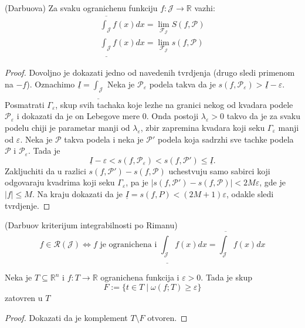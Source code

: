\documentclass[a4paper,12pt]{article}
\newcommand{\f}{\mathscr{F}}
\newcommand{\RR}{\mathbb{R}}
\newcommand{\eps}{\varepsilon}
\newcommand{\psj}{\subseteq}
\begin{document}
\begin{tma}(Darbuova)
	Za svaku ogranichenu funkciju $f:\mathcal J \to \RR$ vazhi:
	\begin{align*}
		\overline{\int_{\mathcal J}}f(x)dx = \lim_{\f _{\mathcal J}} S(f, \mathcal P)\\
		\underline{\int_{\mathcal J}}f(x)dx = \lim_{\f _{\mathcal J}} s(f, \mathcal P)
	\end{align*}
\end{tma}
\begin{proof}
	Dovoljno je dokazati jedno od navedenih tvrdjenja (drugo sledi primenom na $-f$). Oznachimo $\underline I = \underline{\int_{\mathcal J}}$
	Neka je $\mathcal P_\eps$ podela takva da je $s(f, \mathcal P _\eps) > \underline I - \eps$. Posmatrati $\Gamma_\eps$, skup 
	svih tachaka koje lezhe na granici nekog od kvadara podele $\mathcal P_\eps$ i dokazati da je on Lebegove mere 0.
	Onda postoji $\lambda_\eps > 0$ takvo da je za svaku podelu chiji je parametar manji od $\lambda_\eps$, zbir zapremina
	kvadara koji seku $\Gamma_\eps$ manji od $\eps$. Neka je $\mathcal P$ takva podela i neka je $\mathcal P'$ podela koja
	sadrzhi sve tachke podela $\mathcal P$ i $\mathcal P_\eps$. Tada je 
	\[ \underline I - \eps < s(f, \mathcal P_\eps) < s(f, \mathcal P') \leq \underline I .\] 
	Zakljuchiti da u razlici $s(f, \mathcal P') - s(f,\mathcal P)$ uchestvuju samo sabirci koji odgovaraju kvadrima koji
	seku $\Gamma_\eps$, pa je $|s(f, \mathcal P') - s(f,\mathcal P)| < 2M\eps$, gde je $|f| \leq M$. Na kraju dokazati da 
	je $\underline I = s(f, P) < (2M+1)\eps$, odakle sledi tvrdjenje.
\end{proof}

\begin{posl}(Darbuov kriterijum integrabilnosti po Rimanu)
	\[ f \in \mathcal R(\mathcal J) \iff f \text{ je ogranichena i } \underline{\int_{\mathcal J}}f(x)dx = \overline{\int_{\mathcal J}}f(x)dx\] 
\end{posl}

\begin{lema}
	Neka je $T\psj \RR^n$ i $f:T \to\RR$ ogranichena funkcija i $\eps > 0$. Tada je skup
	$$F:=\{t \in T \mid \omega(f; T) \geq \eps\}$$
	zatovren u $T$
\end{lema}
\begin{proof}
	Dokazati da je komplement $T\setminus F$ otvoren.
\end{proof}
\end{document}
